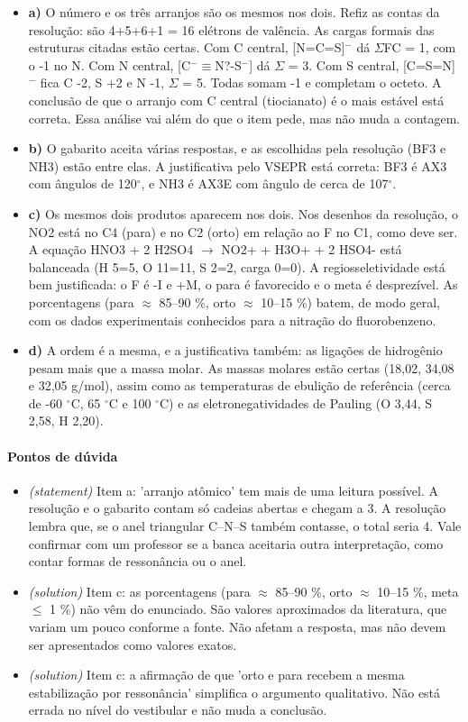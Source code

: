 \documentclass{article}%
\begin{document}
\begin{itemize}%
\item%
\textbf{a)} O número e os três arranjos são os mesmos nos dois. Refiz as contas da resolução: são 4+5+6+1 = 16 elétrons de valência. As cargas formais das estruturas citadas estão certas. Com C central, {[}N=C=S{]}$^{-}$ dá $\Sigma$FC = 1, com o -1 no N. Com N central, {[}C$^{-}$$\equiv$N?-S$^{-}${]} dá $\Sigma$ = 3. Com S central, {[}C=S=N{]}$^{-}$ fica C -2, S +2 e N -1, $\Sigma$ = 5. Todas somam -1 e completam o octeto. A conclusão de que o arranjo com C central (tiocianato) é o mais estável está correta. Essa análise vai além do que o item pede, mas não muda a contagem.%
\item%
\textbf{b)} O gabarito aceita várias respostas, e as escolhidas pela resolução (BF3 e NH3) estão entre elas. A justificativa pelo VSEPR está correta: BF3 é AX3 com ângulos de 120$^\circ$, e NH3 é AX3E com ângulo de cerca de 107$^\circ$.%
\item%
\textbf{c)} Os mesmos dois produtos aparecem nos dois. Nos desenhos da resolução, o NO2 está no C4 (para) e no C2 (orto) em relação ao F no C1, como deve ser. A equação HNO3 + 2 H2SO4 $\to$ NO2+ + H3O+ + 2 HSO4- está balanceada (H 5=5, O 11=11, S 2=2, carga 0=0). A regiosseletividade está bem justificada: o F é -I e +M, o para é favorecido e o meta é desprezível. As porcentagens (para $\approx$ 85--90 \%, orto $\approx$ 10--15 \%) batem, de modo geral, com os dados experimentais conhecidos para a nitração do fluorobenzeno.%
\item%
\textbf{d)} A ordem é a mesma, e a justificativa também: as ligações de hidrogênio pesam mais que a massa molar. As massas molares estão certas (18,02, 34,08 e 32,05 g/mol), assim como as temperaturas de ebulição de referência (cerca de -60 $^\circ$C, 65 $^\circ$C e 100 $^\circ$C) e as eletronegatividades de Pauling (O 3,44, S 2,58, H 2,20).%
\end{itemize}%
\paragraph{Pontos de dúvida}%
\begin{itemize}%
\item%
\textit{(statement)} Item a: 'arranjo atômico' tem mais de uma leitura possível. A resolução e o gabarito contam só cadeias abertas e chegam a 3. A resolução lembra que, se o anel triangular C--N--S também contasse, o total seria 4. Vale confirmar com um professor se a banca aceitaria outra interpretação, como contar formas de ressonância ou o anel.%
\item%
\textit{(solution)} Item c: as porcentagens (para $\approx$ 85--90 \%, orto $\approx$ 10--15 \%, meta $\leq$ 1 \%) não vêm do enunciado. São valores aproximados da literatura, que variam um pouco conforme a fonte. Não afetam a resposta, mas não devem ser apresentados como valores exatos.%
\item%
\textit{(solution)} Item c: a afirmação de que 'orto e para recebem a mesma estabilização por ressonância' simplifica o argumento qualitativo. Não está errada no nível do vestibular e não muda a conclusão.%
\end{itemize}%
\end{document}
